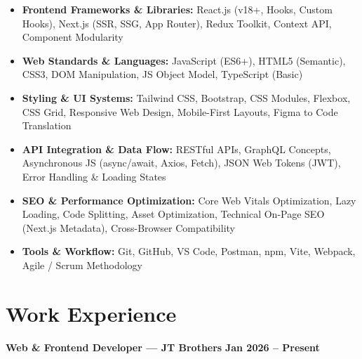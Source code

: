 \documentclass[a4paper,10pt]{article}
\begin{document}
\begin{itemize}

    \item \textbf{Frontend Frameworks \& Libraries:}
    React.js (v18+, Hooks, Custom Hooks), Next.js (SSR, SSG, App Router),
    Redux Toolkit, Context API, Component Modularity

    \item \textbf{Web Standards \& Languages:}
    JavaScript (ES6+), HTML5 (Semantic), CSS3, DOM Manipulation,
    JS Object Model, TypeScript (Basic)

    \item \textbf{Styling \& UI Systems:}
    Tailwind CSS, Bootstrap, CSS Modules, Flexbox, CSS Grid,
    Responsive Web Design, Mobile-First Layouts, Figma to Code Translation

    \item \textbf{API Integration \& Data Flow:}
    RESTful APIs, GraphQL Concepts, Asynchronous JS (async/await, Axios, Fetch),
    JSON Web Tokens (JWT), Error Handling \& Loading States

    \item \textbf{SEO \& Performance Optimization:}
    Core Web Vitals Optimization, Lazy Loading, Code Splitting, Asset Optimization,
    Technical On-Page SEO (Next.js Metadata), Cross-Browser Compatibility

    \item \textbf{Tools \& Workflow:}
    Git, GitHub, VS Code, Postman, npm, Vite, Webpack, Agile / Scrum Methodology

\end{itemize}

\section*{Work Experience}

\textbf{Web \& Frontend Developer --- JT Brothers}
\hfill
\textbf{Jan 2026 -- Present}
\end{document}
